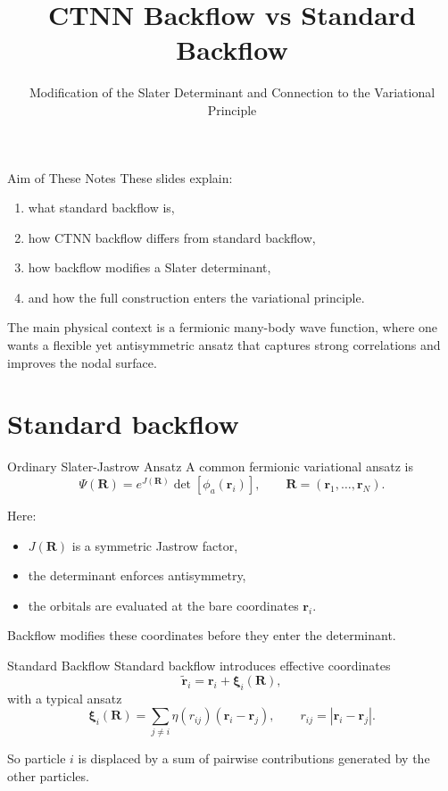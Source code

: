 \documentclass[aspectratio=169]{beamer}
\title{CTNN Backflow vs Standard Backflow}
\subtitle{Modification of the Slater Determinant and Connection to the Variational Principle}
\author{}
\date{}
\begin{document}
\frame{\titlepage}

\begin{frame}{Aim of These Notes}
These slides explain:
\begin{enumerate}
    \item what standard backflow is,
    \item how CTNN backflow differs from standard backflow,
    \item how backflow modifies a Slater determinant,
    \item and how the full construction enters the variational principle.
\end{enumerate}

The main physical context is a fermionic many-body wave function, where one wants a flexible yet antisymmetric ansatz that captures strong correlations and improves the nodal surface.
\end{frame}

\section{Standard backflow}

\begin{frame}{Ordinary Slater-Jastrow Ansatz}
A common fermionic variational ansatz is
\[
\Psi(\mathbf{R}) = e^{J(\mathbf{R})}\det[\phi_a(\mathbf{r}_i)],
\qquad
\mathbf{R}=(\mathbf{r}_1,\dots,\mathbf{r}_N).
\]

Here:
\begin{itemize}
    \item \(J(\mathbf{R})\) is a symmetric Jastrow factor,
    \item the determinant enforces antisymmetry,
    \item the orbitals are evaluated at the bare coordinates \(\mathbf{r}_i\).
\end{itemize}

Backflow modifies these coordinates before they enter the determinant.
\end{frame}

\begin{frame}{Standard Backflow}
Standard backflow introduces effective coordinates
\[
\tilde{\mathbf{r}}_i = \mathbf{r}_i + \bm{\xi}_i(\mathbf{R}),
\]
with a typical ansatz
\[
\bm{\xi}_i(\mathbf{R})
=
\sum_{j\neq i} \eta(r_{ij})(\mathbf{r}_i-\mathbf{r}_j),
\qquad
r_{ij}=|\mathbf{r}_i-\mathbf{r}_j|.
\]

So particle \(i\) is displaced by a sum of pairwise contributions generated by the other particles.
\end{frame}
\end{document}
